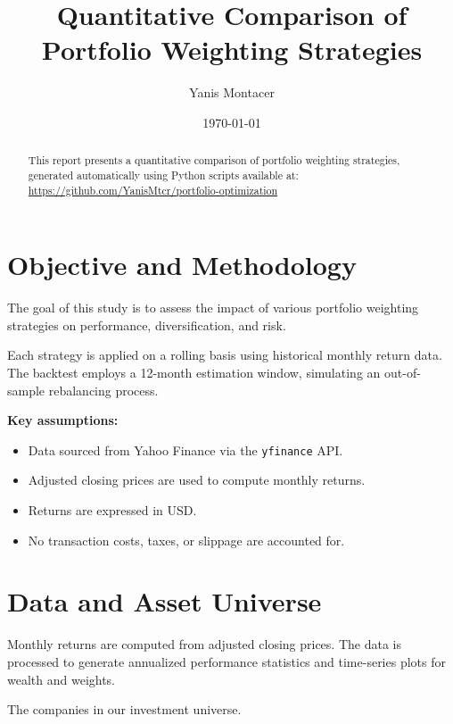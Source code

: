 \documentclass{article}
\title{Quantitative Comparison of Portfolio Weighting Strategies}
\author{Yanis Montacer}
\date{\today}
\begin{document}
\maketitle

\begin{abstract}
This report presents a quantitative comparison of portfolio weighting strategies, generated automatically using Python scripts available at:
\href{https://github.com/your-github-link}{https://github.com/YanisMtcr/portfolio-optimization}
\end{abstract}

\section{Objective and Methodology}

The goal of this study is to assess the impact of various portfolio weighting strategies on performance, diversification, and risk.


Each strategy is applied on a rolling basis using historical monthly return data. The backtest employs a 12-month estimation window, simulating an out-of-sample rebalancing process.

\textbf{Key assumptions:}
\begin{itemize}
    \item Data sourced from Yahoo Finance via the \texttt{yfinance} API.
    \item Adjusted closing prices are used to compute monthly returns.
    \item Returns are expressed in USD.
    \item No transaction costs, taxes, or slippage are accounted for.
\end{itemize}


\section{Data and Asset Universe}

Monthly returns are computed from adjusted closing prices. The data is processed to generate annualized performance statistics and time-series plots for wealth and weights.
\begin{table}[H]
    \centering
    \caption{The companies in our investment universe.}
    \label{tab:company_names}
    \begin{adjustbox}{max width=\textwidth}
        
    \end{adjustbox}
\end{table}
\end{document}
